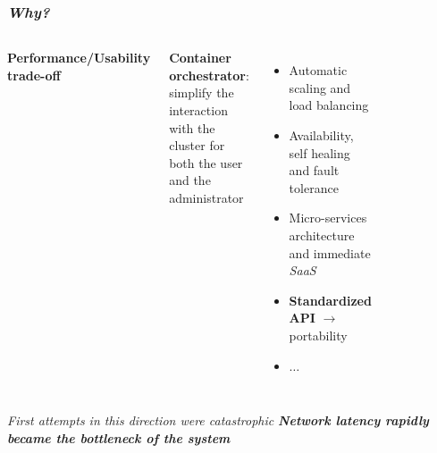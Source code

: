 \begin{frame}
  \frametitle{ \textit{Why?}}
  \begin{columns}
      \textbf{Performance/Usability trade-off}

     \alert{\textbf{Container orchestrator}}: simplify the interaction
         with the cluster for both the user and the administrator
       \begin{itemize}
         \itemsep0em
         \item Automatic scaling and load balancing
         \item Availability, self healing and fault tolerance
         \item Micro-services architecture and immediate \textit{SaaS}
         \item \alert{\textbf{Standardized API}} $\to$ portability
         \item $\dots$
       \end{itemize}
     \begin{figure}
       \centering
       \includegraphics[width=0.75\textwidth]{img/logos/kubernetes-logo}
    \end{figure}
  \end{columns}
   \vfill
   \pause

  \begin{block}{ \textit{First attempts in this
        direction were catastrophic}}
    \centering
    \large
    \textbf{\textit{
         Network latency rapidly became the bottleneck
        of the system
        }}
  \end{block}
\end{frame}

